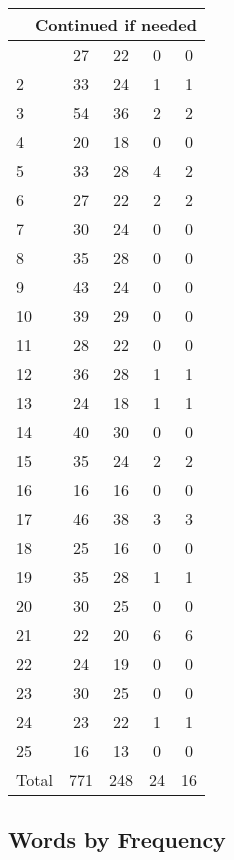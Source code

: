 \begin{center}
\begin{longtable}{l|c|c|c|c}
\hline \multicolumn{5}{|r|}{{Continued if needed}} \\ \hline
\endfoot 
1 & 27 & 22 & 0 & 0\\ \hline
2 & 33 & 24 & 1 & 1\\ \hline
3 & 54 & 36 & 2 & 2\\ \hline
4 & 20 & 18 & 0 & 0\\ \hline
5 & 33 & 28 & 4 & 2\\ \hline
6 & 27 & 22 & 2 & 2\\ \hline
7 & 30 & 24 & 0 & 0\\ \hline
8 & 35 & 28 & 0 & 0\\ \hline
9 & 43 & 24 & 0 & 0\\ \hline
10 & 39 & 29 & 0 & 0\\ \hline
11 & 28 & 22 & 0 & 0\\ \hline
12 & 36 & 28 & 1 & 1\\ \hline
13 & 24 & 18 & 1 & 1\\ \hline
14 & 40 & 30 & 0 & 0\\ \hline
15 & 35 & 24 & 2 & 2\\ \hline
16 & 16 & 16 & 0 & 0\\ \hline
17 & 46 & 38 & 3 & 3\\ \hline
18 & 25 & 16 & 0 & 0\\ \hline
19 & 35 & 28 & 1 & 1\\ \hline
20 & 30 & 25 & 0 & 0\\ \hline
21 & 22 & 20 & 6 & 6\\ \hline
22 & 24 & 19 & 0 & 0\\ \hline
23 & 30 & 25 & 0 & 0\\ \hline
24 & 23 & 22 & 1 & 1\\ \hline
25 & 16 & 13 & 0 & 0\\ \hline
\hline \hline
Total & 771 & 248 & 24 & 16



\end{longtable}
\end{center}

 
\subsection{Words by Frequency}

